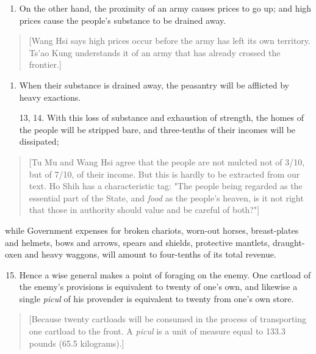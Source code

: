 \documentclass[10pt,a4paper]{book}
\begin{document}
\begin{enumerate}[leftmargin=*, label=\arabic*., wide=0pt, resume]
\item On the other hand, the proximity of an army causes prices to go up; and high prices cause the people's substance to be drained away.
\end{enumerate}

{\small
\begin{quote}
[Wang Hsi says high prices occur before the army has left its own territory. Ts'ao Kung understands it of an army that has already crossed the frontier.]
\end{quote}
}

\begin{enumerate}[leftmargin=*, label=\arabic*., wide=0pt, resume]
\item When their substance is drained away, the peasantry will be afflicted by heavy exactions.
\item[13, 14.] With this loss of substance and exhaustion of strength, the homes of the people will be stripped bare, and three-tenths of their incomes will be dissipated;
\end{enumerate}

{\small
\begin{quote}
[Tu Mu and Wang Hsi agree that the people are not mulcted not of 3/10, but of 7/10, of their income. But this is hardly to be extracted from our text. Ho Shih has a characteristic tag: "The people being regarded as the essential part of the State, and \textit{food} as the people's heaven, is it not right that those in authority should value and be careful of both?"]
\end{quote}
}

\noindent while Government expenses for broken chariots, worn-out horses, breast-plates and helmets, bows and arrows, spears and shields, protective mantlets, draught-oxen and heavy waggons, will amount to four-tenths of its total revenue.

\begin{enumerate}[leftmargin=*, label=\arabic*., wide=0pt, resume]
\setcounter{enumi}{14}
\item Hence a wise general makes a point of foraging on the enemy. One cartload of the enemy's provisions is equivalent to twenty of one's own, and likewise a single \textit{picul} of his provender is equivalent to twenty from one's own store.
\end{enumerate}

{\small
\begin{quote}
[Because twenty cartloads will be consumed in the process of transporting one cartload to the front. A \textit{picul} is a unit of measure equal to 133.3 pounds (65.5 kilograms).]
\end{quote}
}
\end{document}
